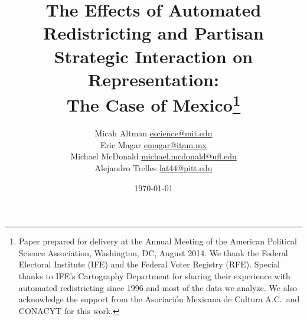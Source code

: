 \documentclass[letter,12pt]{article}
\begin{document}
\title{The Effects of Automated Redistricting and Partisan Strategic Interaction on Representation: \\ 
       The Case of Mexico\thanks{Paper prepared for delivery at the Annual Meeting of the American Political Science Association, Washington, DC, August 2014. We thank the Federal Electoral Institute (IFE) and the Federal Voter Registry (RFE). Special thanks to IFE's Cartography Department for sharing their experience with automated redistricting since 1996 and most of the data we analyze. We also acknowledge the support from the Asociaci\'on Mexicana de Cultura A.C.\ and CONACYT for this work.}}
\author{Micah Altman {\small \url{escience@mit.edu}} \\
        Eric Magar {\small \url{emagar@itam.mx}} \\
        Michael McDonald {\small \url{michael.mcdonald@ufl.edu}} \\  %
        Alejandro Trelles {\small \url{lat44@pitt.edu}}
      }
\date{\today}
\maketitle
\end{document}
